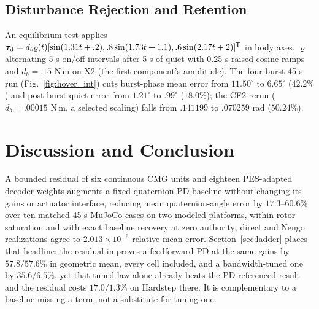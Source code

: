 \documentclass[letterpaper, 10 pt, conference]{ieeeconf}
\newcommand{\T}{^{\mathsf T}}
\begin{document}

\subsection{Disturbance Rejection and Retention}
\label{sec:disturbance}
An equilibrium test applies
$\bm\tau_{\rm d}=d_b\varrho(t)[\sin(1.31t+.2),\allowbreak
.8\sin(1.73t+1.1),\allowbreak.6\sin(2.17t+2)]\T$ in body axes, $\varrho$ alternating
5-s on/off intervals after 5 s of quiet with 0.25-s raised-cosine ramps and
$d_b=.15$ N\,m on X2 (the first component's amplitude). The four-burst 45-s run
(Fig.~\ref{fig:hover_int}) cuts burst-phase mean error from $11.50^\circ$ to
$6.65^\circ$ ($42.2\%$) and post-burst quiet error from $1.21^\circ$ to
$.99^\circ$ ($18.0\%$); the CF2 rerun ($d_b=.00015$ N\,m, a selected scaling)
falls from $.141199$ to $.070259$ rad ($50.24\%$).


\section{Discussion and Conclusion}
\label{sec:conclusion}

A bounded residual of six continuous CMG units and eighteen PES-adapted decoder weights augments a fixed quaternion PD baseline without changing its gains or actuator interface, reducing mean quaternion-angle error by $17.3$--$60.6\%$ over ten matched 45-s MuJoCo cases on two modeled platforms, within rotor saturation and with exact baseline recovery at zero authority; direct and Nengo realizations agree to $2.013\times10^{-6}$ relative mean error.
Section~\ref{sec:ladder} places that headline: the residual improves a feedforward PD at the same gains by $57.8/57.6\%$ in geometric mean, every cell included, and a bandwidth-tuned one by $35.6/6.5\%$, yet that tuned law alone already beats the PD-referenced result and the residual costs $17.0/1.3\%$ on Hardstep there. It is complementary to a baseline missing a term, not a substitute for tuning one.
\end{document}
